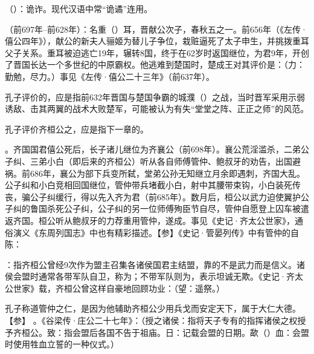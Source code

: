 {
\item {}（）：诡诈。现代汉语中常“诡谲”连用。
\item {}（前697年--前628年）：名重（）耳，晋献公次子，春秋五之一。前656年（《左传·僖公四年》），献公的新夫人骊姬为替儿子争位，栽赃逼死了太子申生，并挑拨重耳父子关系。重耳被迫逃亡19年，辗转8国，终于在62岁时返国继位，为君9年，开创了晋国长达一个多世纪的中原霸权。他逃难到楚国时，楚成王对其评价是：（力：勤勉，尽力。）事见《左传·僖公二十三年》（前637年）。

孔子评价的，应是指前632年晋国与楚国争霸的城濮（）之战，当时晋军采用示弱诱敌、击其两翼的战术大败楚军，可能被认为有失“堂堂之阵、正正之师”的风范。
\item 孔子评价齐桓公之，应是指下一章的。
}
{}  %


{
\item {}。齐国国君僖公死后，长子诸儿继位为齐襄公（前698年）。襄公荒淫滥杀，二弟公子纠、三弟小白（即后来的齐桓公）听从各自师傅管仲、鲍叔牙的劝告，出国避祸。前686年，襄公为部下兵变所弑，堂弟公孙无知继立月余即遇刺，齐国大乱。公子纠和小白竞相回国继位，管仲带兵堵截小白，射中其腰带束钩，小白装死传丧，骗公子纠缓行，得以先入齐为君（前685年）。数月后，桓公以武力迫使翼护公子纠的鲁国杀死公子纠，公子纠的另一位师傅殉臣节自尽，管仲自愿登上囚车被遣返齐国。桓公听从鲍叔牙的力荐重用管仲，遂成。事见《史记·齐太公世家》，通俗演义《东周列国志》中也有精彩描述。【参】《史记·管晏列传》中有管仲的自陈：

\item {}：指齐桓公曾经9次作为盟主召集各诸侯国君主结盟，靠的不是武力而是信义。诸侯会盟时通常各带军队自卫，称为；不带军队则为，表示坦诚无欺。《史记·齐太公世家》载，齐桓公曾这样自豪地回顾功业：（望：遥祭。）

孔子称道管仲之仁，是因为他辅助齐桓公少用兵戈而安定天下，属于大仁大德。【参】 。《谷梁传·庄公二十七年》：（授之诸侯：指将天子专有的指挥诸侯之权授予齐桓公。致：指会盟后各国不告于祖庙。日：记载会盟的日期。歃（）血：会盟时使用牲血立誓的一种仪式。）
}
{}


